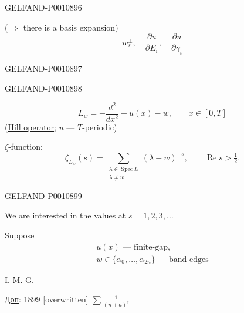 \begin{GelfandAdjacentEvidence}{GELFAND-P001089}{6}


($\Rightarrow$ there is a basis expansion)
\[
w_s^\pm,\quad \frac{\partial u}{\partial E_i},\quad
\frac{\partial u}{\partial\gamma_i}
\]
\end{GelfandAdjacentEvidence}
\begin{GelfandAdjacentEvidence}{GELFAND-P001089}{7}


\medskip
{}
\end{GelfandAdjacentEvidence}
\begin{GelfandAdjacentEvidence}{GELFAND-P001089}{8}

\begin{equation*}
L_w=-\frac{d^2}{dx^2}+u(x)-w,\qquad x\in[0,T]
\tag{1}
\end{equation*}
(\uline{Hill operator}; $u$ — $T$-periodic)

$\zeta$-function:
\begin{equation*}
\zeta_{L_w}(s)=\sum_{\substack{\lambda\in\operatorname{Spec}L\\\lambda\ne w}}
(\lambda-w)^{-s},\qquad \operatorname{Re}s>\tfrac12.
\tag{2}
\end{equation*}
\end{GelfandAdjacentEvidence}
\begin{GelfandAdjacentEvidence}{GELFAND-P001089}{9}


We are interested in the values at $s=1,2,3,\ldots$

Suppose
\begin{equation*}
\begin{gathered}
u(x)\text{ — finite-gap},\\
w\in\{\alpha_0,\ldots,\alpha_{2n}\}\text{ — band edges}
\end{gathered}
\tag{3}
\end{equation*}

\uline{I. M. G.}\quad{}

\uline{Доп}:  1899 [overwritten]
$\displaystyle\sum\frac{1}{(n+a)^s}$
\end{GelfandAdjacentEvidence}
